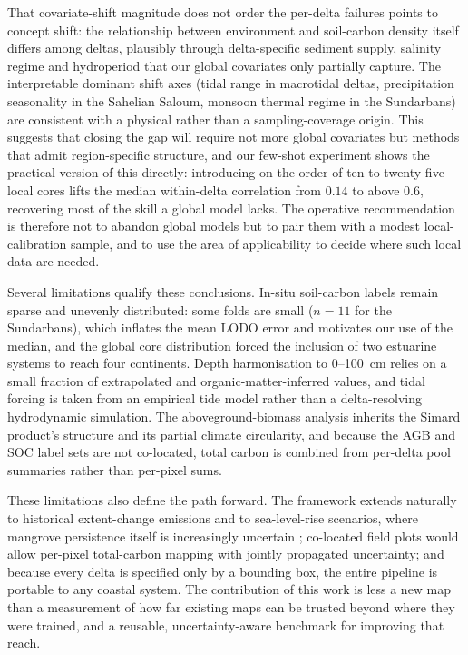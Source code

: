 \documentclass[twocolumn,9pt]{extarticle}
\begin{document}
That covariate-shift magnitude does not order the per-delta failures points to concept
shift: the relationship between environment and soil-carbon density itself differs among
deltas, plausibly through delta-specific sediment supply, salinity regime and
hydroperiod that our global covariates only partially capture. The interpretable
dominant shift axes (tidal range in macrotidal deltas, precipitation seasonality in the
Sahelian Saloum, monsoon thermal regime in the Sundarbans) are consistent with a physical rather than a sampling-coverage origin. This suggests that closing the gap will
require not more global covariates but methods that admit region-specific structure, and our few-shot experiment shows the practical version of this directly: introducing on
the order of ten to twenty-five local cores lifts the median within-delta correlation
from $0.14$ to above $0.6$, recovering most of the skill a global model lacks. The
operative recommendation is therefore not to abandon global models but to pair them with
a modest local-calibration sample, and to use the area of applicability to decide where
such local data are needed.

Several limitations qualify these conclusions. In-situ soil-carbon labels remain sparse
and unevenly distributed: some folds are small ($n=11$ for the Sundarbans), which
inflates the mean LODO error and motivates our use of the median, and the global core
distribution forced the inclusion of two estuarine systems to reach four continents.
Depth harmonisation to 0--100~cm relies on a small fraction of extrapolated and
organic-matter-inferred values, and tidal forcing is taken from an empirical tide model
rather than a delta-resolving hydrodynamic simulation. The aboveground-biomass analysis
inherits the Simard product's structure and its partial climate circularity, and
because the AGB and SOC label sets are not co-located, total carbon is combined from
per-delta pool summaries rather than per-pixel sums.

These limitations also define the path forward. The framework extends naturally to
historical extent-change emissions and to sea-level-rise scenarios, where mangrove
persistence itself is increasingly uncertain \cite{lovelock2015,saintilan2020}; co-located
field plots would allow per-pixel total-carbon mapping with jointly propagated
uncertainty; and because every delta is specified only by a bounding box, the entire
pipeline is portable to any coastal system. The contribution of this work is less a new
map than a measurement of how far existing maps can be trusted beyond where they were trained, and a reusable, uncertainty-aware benchmark for improving that reach.
\end{document}
